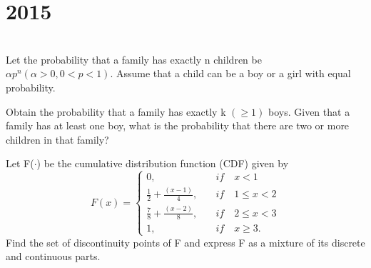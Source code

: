 \section*{2015}
\vspace{-.5cm}
\hrulefill \smallskip\\
 Let the probability that a family has exactly n children be $\alpha p^n(\alpha >0, 0 < p <1)$. Assume that a child can be a boy or a girl with equal probability. \begin{tasks}
\task Obtain the probability that a family has exactly k $(\geq 1)$ boys.
\task Given that a family has at least one boy, what is the probability that there are two or more children in that family?
\end{tasks}
 Let F($\cdot$) be the cumulative distribution function (CDF) given by \[ F(x) = \begin{cases}
             0,\quad &if\quad x<1\\
             \frac{1}{2} + \frac{(x-1)}{4},\quad &if\quad 1\leq x<2\\
             \frac{7}{8} + \frac{(x-2)}{8},\quad &if\quad 2\leq x<3\\
             1,\quad &if\quad x\geq 3.
    \end{cases}\] Find the set of discontinuity points of F and express F as a mixture of its discrete and continuous parts.